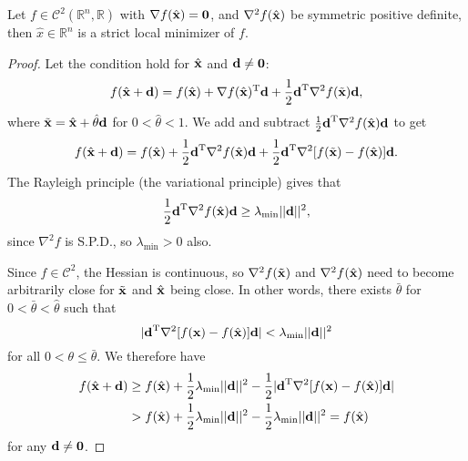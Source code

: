 \documentclass{article}
\begin{document}
\begin{theorem}
    Let $f\in\mathcal{C}^2(\mathbb{R}^n,\mathbb{R})$ with $\nabla f(\hat{\bm{\mathrm{x}}})=\bm{\mathrm{0}}$, and $\nabla^2 f(\hat{\bm{\mathrm{x}}})$ be symmetric positive definite, then $\hat{x}\in\mathbb{R}^n$ is a strict local minimizer of $f$.
\end{theorem}
\begin{proof}
    Let the condition hold for $\hat{\bm{\mathrm{x}}}$ and $\bm{\mathrm{d}}\neq\bm{\mathrm{0}}$:
    \begin{equation}
        f(\hat{\bm{\mathrm{x}}}+\bm{\mathrm{d}})=f(\hat{\bm{\mathrm{x}}})+\nabla f(\hat{\bm{\mathrm{x}}})^{\text{T}}\bm{\mathrm{d}}+\frac{1}{2}\bm{\mathrm{d}}^{\text{T}}\nabla^2f(\tilde{\bm{\mathrm{x}}})\bm{\mathrm{d}},
    \end{equation}
    where $\tilde{\bm{\mathrm{x}}}=\hat{\bm{\mathrm{x}}}+\hat{\theta}\bm{\mathrm{d}}$ for $0<\hat{\theta}<1$. We add and subtract $\frac{1}{2}\bm{\mathrm{d}}^{\text{T}}\nabla^2f(\hat{\bm{\mathrm{x}}})\bm{\mathrm{d}}$ to get
    \begin{equation}
        f(\hat{\bm{\mathrm{x}}}+\bm{\mathrm{d}})=f(\hat{\bm{\mathrm{x}}})+\frac{1}{2}\bm{\mathrm{d}}^{\text{T}}\nabla^2f(\hat{\bm{\mathrm{x}}})\bm{\mathrm{d}}+\frac{1}{2}\bm{\mathrm{d}}^{\text{T}}\nabla^2[f(\tilde{\bm{\mathrm{x}}})-f(\hat{\bm{\mathrm{x}}})]\bm{\mathrm{d}}.
    \end{equation}
    The Rayleigh principle (the variational principle) gives that
    \begin{equation}
        \frac{1}{2}\bm{\mathrm{d}}^{\text{T}}\nabla^2f(\hat{\bm{\mathrm{x}}})\bm{\mathrm{d}}\geq \lambda_{\mathrm{min}}||\bm{\mathrm{d}}||^2,
    \end{equation}
    since $\nabla^2 f$ is S.P.D., so $\lambda_{\min}>0$ also.
    
    Since $f\in\mathcal{C}^2$, the Hessian is continuous, so $\nabla^2f(\tilde{\bm{\mathrm{x}}})$ and $\nabla^2f(\hat{\bm{\mathrm{x}}})$ need to become arbitrarily close for $\tilde{\bm{\mathrm{x}}}$ and $\hat{\bm{\mathrm{x}}}$ being close. In other words, there exists $\bar{\theta}$ for $0<\bar{\theta}<\hat{\theta}$ such that
    \begin{equation}
        |\bm{\mathrm{d}}^{\text{T}}\nabla^2[f({\bm{\mathrm{x}}})-f(\hat{\bm{\mathrm{x}}})]\bm{\mathrm{d}}|<\lambda_{\mathrm{min}}||\bm{\mathrm{d}}||^2
    \end{equation}
    for all $0<\theta\leq\bar{\theta}$. We therefore have
    \begin{align}
        f(\hat{\bm{\mathrm{x}}}+\bm{\mathrm{d}})&\geq f(\hat{\bm{\mathrm{x}}})+\frac{1}{2}\lambda_{\mathrm{min}}||\bm{\mathrm{d}}||^2-\frac{1}{2}|\bm{\mathrm{d}}^{\text{T}}\nabla^2[f({\bm{\mathrm{x}}})-f(\hat{\bm{\mathrm{x}}})]\bm{\mathrm{d}}|\\
        &> f(\hat{\bm{\mathrm{x}}})+\frac{1}{2}\lambda_{\mathrm{min}}||\bm{\mathrm{d}}||^2-\frac{1}{2}\lambda_{\mathrm{min}}||\bm{\mathrm{d}}||^2=f(\hat{\bm{\mathrm{x}}})
    \end{align}
    for any $\bm{\mathrm{d}}\neq\bm{\mathrm{0}}$.
\end{proof}
\end{document}
